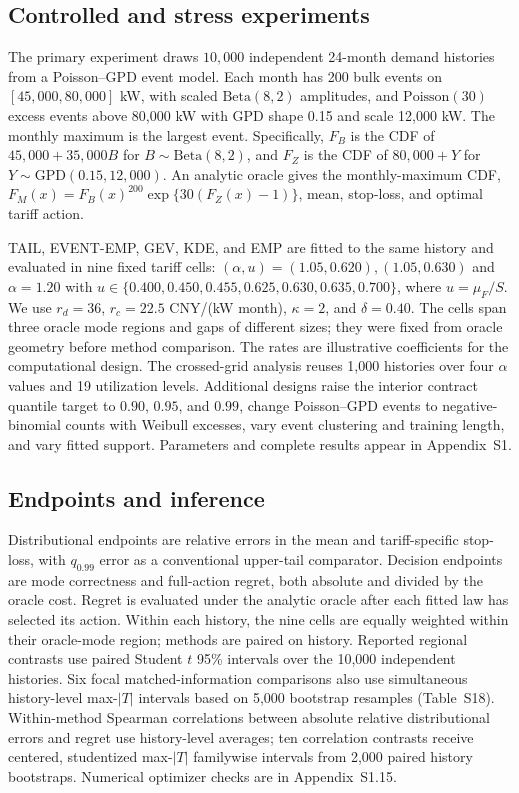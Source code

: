\documentclass[suppldata]{interact}
\begin{document}
\subsection{Controlled and stress experiments}
The primary experiment draws $10{,}000$ independent 24-month demand
histories from a Poisson--GPD event model. Each month has 200 bulk
events on $[45{,}000,80{,}000]$ kW, with scaled $\mathrm{Beta}(8,2)$
amplitudes, and $\mathrm{Poisson}(30)$ excess events above 80,000 kW
with GPD shape 0.15 and scale 12,000 kW. The monthly maximum is the
largest event. Specifically, $F_B$ is the CDF of
$45{,}000+35{,}000B$ for $B\sim\mathrm{Beta}(8,2)$, and $F_Z$
is the CDF of $80{,}000+Y$ for
$Y\sim\mathrm{GPD}(0.15,12{,}000)$. An analytic oracle gives
the monthly-maximum CDF,
$F_M(x)=F_B(x)^{200}\exp\{30(F_Z(x)-1)\}$, mean, stop-loss, and
optimal tariff action.

TAIL, EVENT-EMP, GEV, KDE, and EMP are fitted to the same history
and evaluated in nine fixed tariff cells: $(\alpha,u)=(1.05,0.620),
(1.05,0.630)$ and $\alpha=1.20$ with
$u\in\{0.400,0.450,0.455,0.625,0.630,0.635,0.700\}$,
where $u=\mu_F/S$. We use $r_d=36$, $r_c=22.5$ CNY/(kW month),
$\kappa=2$, and $\delta=0.40$. The cells span three oracle mode
regions and gaps of different sizes; they were fixed from oracle
geometry before method comparison. The rates are illustrative coefficients for the computational design.
The crossed-grid analysis reuses
1,000 histories over four $\alpha$ values and 19 utilization levels.
Additional designs raise the interior contract quantile target to
$0.90$, $0.95$, and $0.99$, change Poisson--GPD events to
negative-binomial counts with Weibull excesses, vary event clustering
and training length, and vary fitted support. Parameters and complete
results appear in Appendix~S1.

\subsection{Endpoints and inference}
\label{sec:controlled-mechanism}
Distributional endpoints are relative errors in the mean and
tariff-specific stop-loss, with $q_{0.99}$ error as a conventional
upper-tail comparator. Decision endpoints are mode correctness and
full-action regret, both absolute and divided by the oracle cost.
Regret is evaluated under the analytic oracle after each fitted law
has selected its action. Within each history, the nine cells are
equally weighted within their oracle-mode region; methods are paired
on history. Reported regional contrasts use paired Student $t$
95\% intervals over the 10,000 independent histories. Six focal
matched-information comparisons also use simultaneous history-level
max-$|T|$ intervals based on 5,000 bootstrap resamples (Table~S18). Within-method Spearman correlations between absolute relative
distributional errors and regret use history-level averages;
ten correlation contrasts receive centered, studentized max-$|T|$
familywise intervals from 2,000 paired history bootstraps. Numerical
optimizer checks are in Appendix~S1.15.
\end{document}
